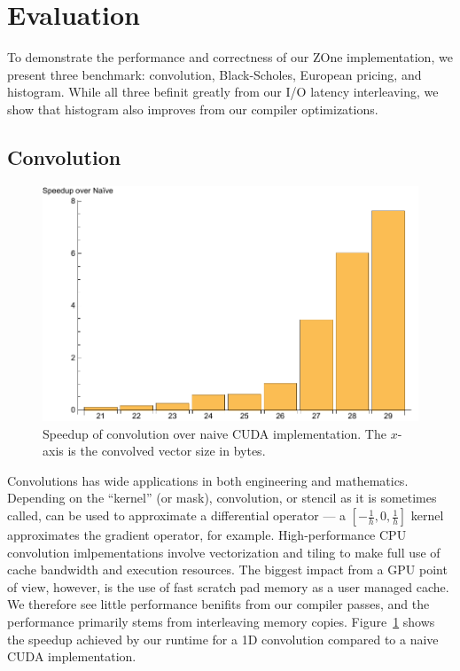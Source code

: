 \section{Evaluation}

To demonstrate the performance and correctness of our ZOne implementation, we
present three benchmark: convolution, Black-Scholes, European pricing, and histogram.
While all three befinit greatly from our I/O latency interleaving, we show
	that histogram also improves from our compiler optimizations.


\subsection{Convolution}

\begin{figure}
\centering
\includegraphics[scale=0.5]{data/stencil.pdf}
\caption{Speedup of convolution over naive CUDA implementation.
	The $x$-axis is the convolved vector size in bytes.}
\label{fig:stencil}
\centering
\end{figure}

Convolutions has wide applications in both engineering and mathematics.
Depending on the ``kernel'' (or mask), convolution, or stencil as it is sometimes called,  	can be used to approximate a differential operator --- 
 a $[-\frac{1}{h}, 0, \frac{1}{h}]$ kernel approximates the gradient operator, for example.
High-performance CPU convolution imlpementations
involve vectorization and tiling to make full use of cache bandwidth and 
execution resources.
The biggest impact from a GPU point of view, however, is the use of fast 
	scratch pad memory as a user managed cache.
We therefore see little performance benifits from our compiler passes, and the
	performance primarily stems from interleaving memory copies.
Figure~\ref{fig:stencil} shows the speedup achieved by our runtime for a 1D
	convolution compared to a naive CUDA implementation.


